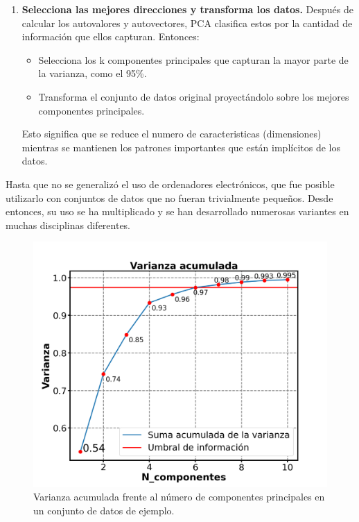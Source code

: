 \documentclass[12pt,letterpaper,oneside,openright]{book}
\begin{document}
\begin{enumerate}
		\item \textbf{Selecciona las mejores direcciones y transforma los datos.}
		Después de calcular los autovalores y autovectores, PCA clasifica estos por la cantidad de información que ellos capturan. Entonces: 
		\begin{itemize}
			\item Selecciona los k componentes principales que capturan la mayor parte de la varianza, como el 95\%.
			\item Transforma el conjunto de datos original proyectándolo sobre los mejores componentes principales. 
		\end{itemize}
		Esto significa que se reduce el numero de caracteristicas (dimensiones) mientras se mantienen los patrones importantes que están implícitos de los datos.
	\end{enumerate}
	
	Hasta que no se generalizó el uso de ordenadores electrónicos, que fue posible utilizarlo con conjuntos de datos que no fueran trivialmente pequeños. Desde entonces, su uso se ha multiplicado y se han desarrollado numerosas variantes en muchas disciplinas diferentes.
	
	\begin{figure}[h]
		\centering
		\includegraphics[width=0.8\linewidth]{Sem_1/figuras/suma_acumulada_varianza.png}
		\caption{Varianza acumulada frente al número de componentes principales en un conjunto de datos de ejemplo.}
		\label{fig:varianza_acumulada}
	\end{figure}
	
\end{document}
